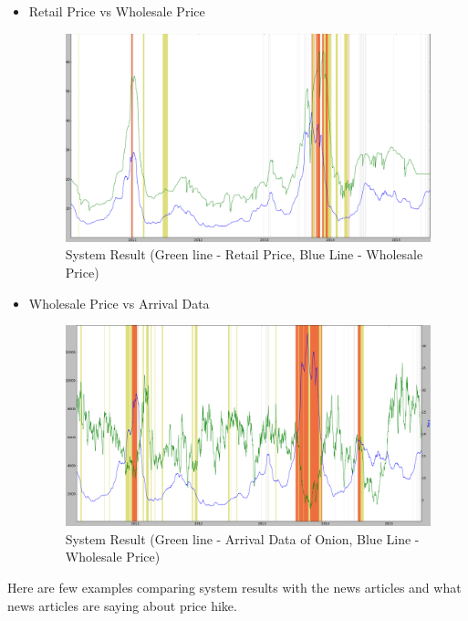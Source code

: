 \documentclass[a4paper,10pt]{article}
\begin{document}
\begin{itemize}
	
 \item Retail Price vs Wholesale Price
			
			\begin{figure}[H]
		    	\centering
  		    	\includegraphics[width=1.1\textwidth]{graphs/retailVsWS_Whole.png}
		    	\caption{System Result (Green line - Retail Price, Blue Line - Wholesale Price)}
		    	\label{fig:RvsW}
			\end{figure}
			
	
 \item Wholesale Price vs Arrival Data
			
			\begin{figure}[H]
		    	\centering
  		    	\includegraphics[width=1.1\textwidth]{graphs/WSvsArrival.png}
		    	\caption{System Result (Green line - Arrival Data of Onion, Blue Line - Wholesale Price)}
		    	\label{fig:WvsA}
			\end{figure}
			
	
\end{itemize}


Here are few examples comparing system results with the news articles and what news articles are saying about price hike.
\end{document}
